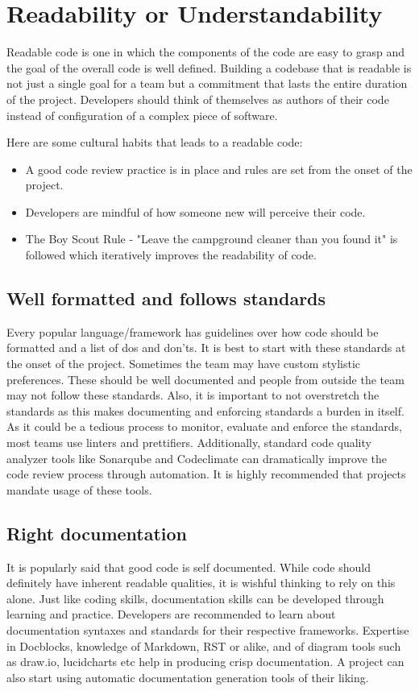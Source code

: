 \chapter{Readability or Understandability}

Readable code is one in which the components of the code are easy to grasp and the goal of the overall code is well defined. Building a codebase that is readable is not just a single goal for a team but a commitment that lasts the entire duration of the project. Developers should think of themselves as authors of their code instead of configuration of a complex piece of software.

Here are some cultural habits that leads to a readable code:


\begin{itemize}
  \item A good code review practice is in place and rules are set from the onset of the project.
  \item Developers are mindful of how someone new will perceive their code.
  \item The Boy Scout Rule - "Leave the campground cleaner than you found it" is followed which iteratively improves the readability of code.
\end{itemize}



\section{Well formatted and follows standards}

Every popular language/framework has guidelines over how code should be formatted and a list of dos and don'ts. It is best to start with these standards at the onset of the project. Sometimes the team may have custom stylistic preferences. These should be well documented and people from outside the team may not follow these standards. Also, it is important to not overstretch the standards as this makes documenting and enforcing standards a burden in itself. As it could be a tedious process to monitor, evaluate and enforce the standards, most teams use linters and prettifiers. Additionally, standard code quality analyzer tools like Sonarqube and Codeclimate can dramatically improve the code review process through automation. It is highly recommended that projects mandate usage of these tools.


\section{Right documentation}
It is popularly said that good code is self documented. While code should definitely have inherent readable qualities, it is wishful thinking to rely on this alone. Just like coding skills, documentation skills can be developed through learning and practice. Developers are recommended to learn about documentation syntaxes and standards for their respective frameworks. Expertise in Docblocks, knowledge of Markdown, RST or alike, and of diagram tools such as draw.io, lucidcharts etc help in producing crisp documentation. A project can also start using automatic documentation generation tools of their liking.

